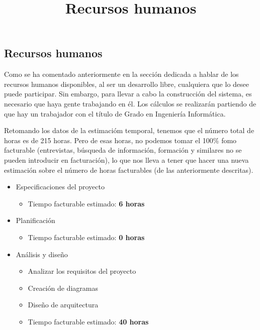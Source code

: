 \subsection{Recursos humanos}
\title{Recursos humanos}

Como se ha comentado anteriormente en la sección dedicada a hablar de los recursos humanos disponibles,
al ser un desarrollo libre, cualquiera que lo desee puede participar. Sin embargo, para llevar a cabo la
construcción del sistema, es necesario que haya gente trabajando en él. Los cálculos
se realizarán partiendo de que hay un trabajador con el título de Grado en Ingeniería Informática.

Retomando los datos de la estimacióm temporal, tenemos que el número total de horas es
de 215 horas. Pero de esas horas, no podemos tomar el 100\% fomo facturable (entrevistas,
búsqueda de información, formación y similares no se pueden introducir en facturación),
lo que nos lleva a tener que hacer una nueva estimación sobre el número de horas facturables
(de las anteriormente descritas).


\begin{itemize}
  \item Especificaciones del proyecto
  \begin{itemize}
    \item{Tiempo facturable estimado: \textbf{6 horas}}
  \end{itemize}
\end{itemize}

\begin{itemize}
  \item Planificación
  \begin{itemize}
    \item{Tiempo facturable estimado: \textbf{0 horas}}
  \end{itemize}
\end{itemize}

\begin{itemize}
  \item Análisis y diseño
  \begin{itemize}
    \item{Analizar los requisitos del proyecto}
    \item{Creación de diagramas}
    \item{Diseño de arquitectura}
    \item{Tiempo facturable estimado: \textbf{40 horas}}
  \end{itemize}
\end{itemize}


